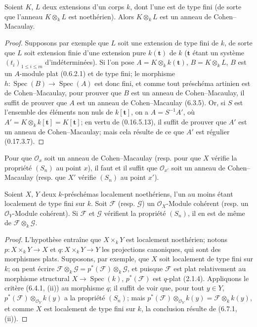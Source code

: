 \begin{lemma}[6.7.1.1]
\label{IV.2.s6.7.1.1-fr}
Soient $K$, $L$ deux extensions d'un corps $k$, dont l'une est de type
fini (de sorte que l'anneau $K\otimes_k L$ est noethérien). Alors
$K\otimes_k L$ est un anneau de Cohen--Macaulay.
\end{lemma}

\begin{proof}
Supposons par exemple que $L$ soit une extension de type fini de $k$,
de sorte que $L$ soit extension finie d'une extension pure $k(\boldsymbol t)$
de $k$ ($\boldsymbol t$ étant un système $(t_i)_{1\leqslant i\leqslant m}$
d'indéterminées). Si l'on pose $A=K\otimes_k k(\boldsymbol t)$,
$B=K\otimes_k L$, $B$ est un $A$-module plat (0.6.2.1) et de type fini;
le morphisme $h:\operatorname{Spec}(B)\to\operatorname{Spec}(A)$ est
donc fini, et comme tout préschéma artinien est de Cohen--Macaulay, pour
prouver que $B$ est un anneau de Cohen--Macaulay, il suffit de prouver que
$A$ est un anneau de Cohen--Macaulay (6.3.5). Or, si $S$ est l'ensemble
des éléments non nuls de $k[\boldsymbol t]$, on a $A=S^{-1}A'$, où
$A'=K\otimes_k k[\boldsymbol t]=K[\boldsymbol t]$; en vertu de
(0.16.5.13), il suffit de prouver que $A'$ est un anneau de
Cohen--Macaulay; mais cela résulte de ce que $A'$ est régulier (0.17.3.7).
\end{proof}

\begin{corollary}[6.7.2]
\label{IV.2.s6.7.2-fr}
Pour que $\mathcal O_x$ soit un anneau de Cohen--Macaulay (resp. pour
que $X$ vérifie la propriété $(S_n)$ au point $x$), il faut et il suffit
que $\mathcal O_{x'}$ soit un anneau de Cohen--Macaulay (resp. que $X'$
vérifie $(S_n)$ au point $x'$).
\end{corollary}

\begin{corollary}[6.7.3]
\label{IV.2.s6.7.3-fr}
Soient $X$, $Y$ deux $k$-préschémas localement noethériens, l'un au
moins étant localement de type fini sur $k$. Soit $\mathscr F$ (resp.
$\mathscr G$) un $\mathcal O_X$-Module cohérent (resp. un
$\mathcal O_Y$-Module cohérent). Si $\mathscr F$ et $\mathscr G$
vérifient la propriété $(S_n)$, il en est de même de
$\mathscr F\otimes_k\mathscr G$.
\end{corollary}

\begin{proof}
L'hypothèse entraîne que $X\times_kY$ est localement noethérien; notons
$p:X\times_kY\to X$ et $q:X\times_kY\to Y$ les projections canoniques,
qui sont des morphismes plats. Supposons, par exemple, que $X$ soit
localement de type fini sur $k$; on peut écrire
$\mathscr F\otimes_k\mathscr G=p^*(\mathscr F)\otimes_k\mathscr G$,
et puisque $\mathscr F$ est plat relativement au morphisme structural
$X\to\operatorname{Spec}(k)$, $p^*(\mathscr F)$ est $q$-plat (2.1.4).
Appliquons le critère (6.4.1, (ii)) au morphisme $q$; il suffit de voir
que, pour tout $y\in Y$, $p^*(\mathscr F)\otimes_{\mathcal O_Y}k(y)$
a la propriété $(S_n)$; mais
$p^*(\mathscr F)\otimes_{\mathcal O_Y}k(y)=\mathscr F\otimes_k k(y)$,
et comme $X$ est localement de type fini sur $k$, la conclusion résulte
de (6.7.1, (ii)).
\end{proof}

